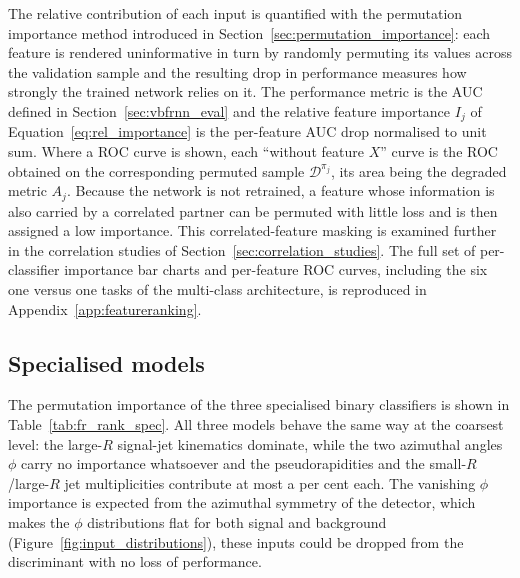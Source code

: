 The relative contribution of each input is quantified with the permutation importance method introduced in Section~\ref{sec:permutation_importance}: each feature is rendered uninformative in turn by randomly permuting its values across the validation sample and the resulting drop in performance measures how strongly the trained network relies on it. The performance metric is the AUC defined in Section~\ref{sec:vbfrnn_eval} and the relative feature importance $I_j$ of Equation~\eqref{eq:rel_importance} is the per-feature AUC drop normalised to unit sum. Where a ROC curve is shown, each ``without feature $X$'' curve is the ROC obtained on the corresponding permuted sample $\mathcal{D}^{\pi_j}$, its area being the degraded metric $A_j$. Because the network is not retrained, a feature whose information is also carried by a correlated partner can be permuted with little loss and is then assigned a low importance. This correlated-feature masking is examined further in the correlation studies of Section~\ref{sec:correlation_studies}. The full set of per-classifier importance bar charts and per-feature ROC curves, including the six one versus one tasks of the multi-class architecture, is reproduced in Appendix~\ref{app:featureranking}.

\subsection{Specialised models}
\label{sec:fr_specialised}

The permutation importance of the three specialised binary classifiers is shown in Table~\ref{tab:fr_rank_spec}. All three models behave the same way at the coarsest level: the large-$R$ signal-jet kinematics dominate, while the two azimuthal angles $\phi$ carry no importance whatsoever and the pseudorapidities and the small-$R$/large-$R$ jet multiplicities contribute at most a per cent each. The vanishing $\phi$ importance is expected from the azimuthal symmetry of the detector, which makes the $\phi$ distributions flat for both signal and background (Figure~\ref{fig:input_distributions}), these inputs could be dropped from the discriminant with no loss of performance.

